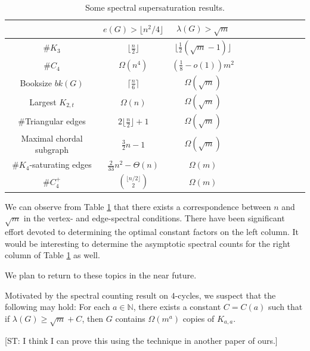 \documentclass[11pt,a4paper]{article}
\theoremstyle{definition}
\theoremstyle{remark}
\begin{document}
\begin{table}[H]
\centering
\begin{tabular}{ccccccccccc}
\toprule
  & $e(G)> \lfloor n^2/4\rfloor$ & $\lambda (G) > \sqrt{m}$ \\
\midrule
 $\#K_3$ & $\lfloor \frac{n}{2} \rfloor$    \cite{Erd1955,Erdos1964}  
 &  $\lfloor \frac{1}{2}(\sqrt{m} -1) \rfloor$ 
 \cite{NZ2021b}  \\
 $\#C_4$ & $\Omega (n^4) $  & $(\frac{1}{8} - o(1))m^2 $  \\ 
 Booksize $bk(G)$ & $\lceil \frac{n}{6} \rceil $  \cite{KN1979} 
 &  $\Omega (\sqrt{m})$  \\
      Largest $K_{2,t}$ & $\Omega(n)$ & $\Omega (\sqrt{m})$  \\ 
 $\#$Triangular edges & $2\lfloor \frac{n}{2}\rfloor +1$  \cite{EFR1992} & $\Omega (\sqrt{m})$ \\ 
 Maximal chordal subgraph & $\frac{3}{2}n-1$  \cite{EGOZ1989}  & $\Omega (\sqrt{m})$ \\  
 $\#K_4$-saturating edges & $\frac{2}{33}n^2 - \Theta(n)$  \cite{BL2014} 
 &  $\Omega (m)$ \\  
  $\#C_4^+$ & ${\lfloor n/2\rfloor \choose 2}$ 
 \cite{Mubayi2010} &  $\Omega(m)$ \\ 
\bottomrule 
\end{tabular}
\caption{Some spectral supersaturation results.}
 \label{tab-SSSR}
\end{table}

We can observe from Table \ref{tab-SSSR} that there exists a correspondence between $n$  and $\sqrt{m}$ in the vertex- and edge-spectral conditions. 
There have been significant effort devoted to determining the optimal constant factors on the left column. It would be interesting to determine the asymptotic spectral counts for the right column of Table \ref{tab-SSSR} as well. 

We plan to return to these topics in the near future.







\iffalse
{\color{red} 
Motivated by the spectral counting result on $4$-cycles, 
we suspect that the following may hold: For each $a\in \mathbb{N}$, there exists a constant $C=C(a)$ such that if $\lambda(G) \geq \sqrt{m} + C$, then $G$ contains $\Omega(m^a)$ copies of $K_{a,a}$. 

[ST: I think I can prove this using the technique in another paper of ours.]
}
\end{document}
